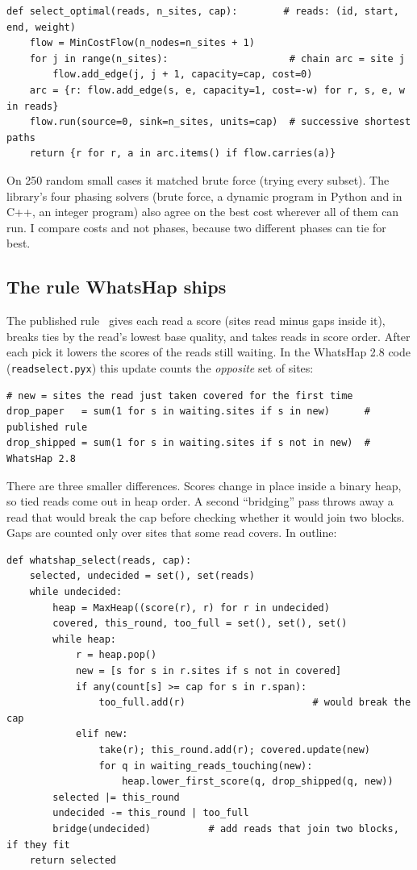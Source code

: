 \documentclass[11pt]{article}
\newcommand{\code}[1]{\texttt{#1}}
\begin{document}
\begin{lstlisting}
def select_optimal(reads, n_sites, cap):        # reads: (id, start, end, weight)
    flow = MinCostFlow(n_nodes=n_sites + 1)
    for j in range(n_sites):                     # chain arc = site j
        flow.add_edge(j, j + 1, capacity=cap, cost=0)
    arc = {r: flow.add_edge(s, e, capacity=1, cost=-w) for r, s, e, w in reads}
    flow.run(source=0, sink=n_sites, units=cap)  # successive shortest paths
    return {r for r, a in arc.items() if flow.carries(a)}
\end{lstlisting}

On 250 random small cases it matched brute force (trying every subset).
The library's four phasing solvers (brute force, a dynamic program in Python
and in C++, an integer program) also agree on the best cost wherever all of
them can run. I compare costs and not phases, because two different phases
can tie for best.

\subsection{The rule WhatsHap ships}

The published rule~\cite{fischer2016} gives each read a score (sites read
minus gaps inside it), breaks ties by the read's lowest base quality, and
takes reads in score order. After each pick it lowers the scores of the
reads still waiting. In the WhatsHap 2.8 code (\code{readselect.pyx}) this
update counts the \emph{opposite} set of sites:

\begin{lstlisting}
# new = sites the read just taken covered for the first time
drop_paper   = sum(1 for s in waiting.sites if s in new)      # published rule
drop_shipped = sum(1 for s in waiting.sites if s not in new)  # WhatsHap 2.8
\end{lstlisting}

There are three smaller differences. Scores change in place inside a
binary heap, so tied reads come out in heap order. A second \enquote{bridging}
pass throws away a read that would break the cap before checking whether it
would join two blocks. Gaps are counted only over sites that some read
covers. In outline:

\begin{lstlisting}
def whatshap_select(reads, cap):
    selected, undecided = set(), set(reads)
    while undecided:
        heap = MaxHeap((score(r), r) for r in undecided)
        covered, this_round, too_full = set(), set(), set()
        while heap:
            r = heap.pop()
            new = [s for s in r.sites if s not in covered]
            if any(count[s] >= cap for s in r.span):
                too_full.add(r)                      # would break the cap
            elif new:
                take(r); this_round.add(r); covered.update(new)
                for q in waiting_reads_touching(new):
                    heap.lower_first_score(q, drop_shipped(q, new))
        selected |= this_round
        undecided -= this_round | too_full
        bridge(undecided)          # add reads that join two blocks, if they fit
    return selected
\end{lstlisting}
\end{document}
